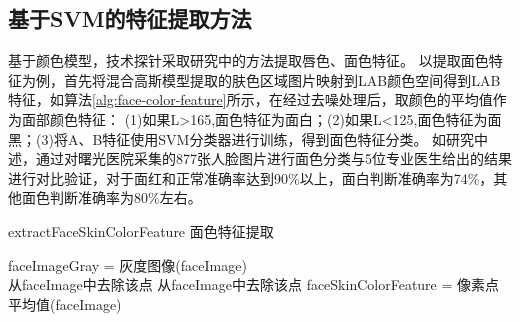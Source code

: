 \subsection{基于SVM的特征提取方法}
基于颜色模型，技术探针采取研究\cite{Hu2016Robust, Zhao2014Qualitative}中的方法提取唇色、面色特征。
以提取面色特征为例，首先将混合高斯模型提取的肤色区域图片映射到LAB颜色空间得到LAB特征，如算法\ref{alg:face-color-feature}所示，在经过去噪处理后，取颜色的平均值作为面部颜色特征：
(1)如果L>165,面色特征为面白；(2)如果L<125,面色特征为面黑；(3)将A、B特征使用SVM分类器进行训练，得到面色特征分类。
如研究\cite{Zhao2014Qualitative}中述，通过对曙光医院采集的877张人脸图片进行面色分类与5位专业医生给出的结果进行对比验证，对于面红和正常准确率达到90\%以上，面白判断准确率为74\%，其他面色判断准确率为80\%左右。

\begin{algorithm}[htbp]
    \caption{extractFaceSkinColorFeature 面色特征提取\cite{Zhao2014Qualitative}}%
    \label{alg:face-color-feature}
    \LinesNumbered %
    faceImageGray = 灰度图像(faceImage)\\

     {
         {
            从faceImage中去除该点
        }
         {
            从faceImage中去除该点
        }
    }
    faceSkinColorFeature = 像素点平均值(faceImage)\\
    \\
\end{algorithm}


